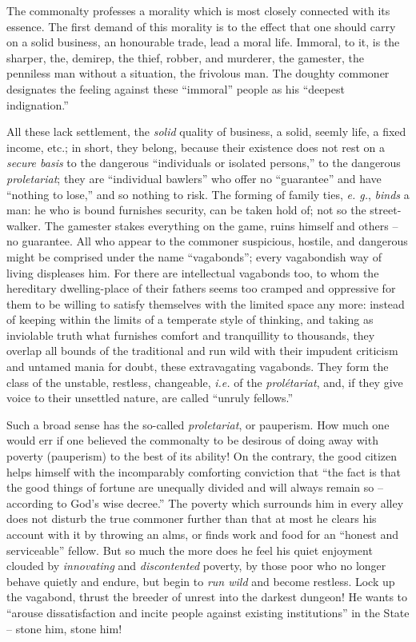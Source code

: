 \documentclass[12pt,a4paper]{book}
\begin{document}
The commonalty professes a morality which is most closely connected with its 
essence. The first demand of this morality is to the effect that one should 
carry on a solid business, an honourable trade, lead a moral life. Immoral, to 
it, is the sharper, the, demirep, the thief, robber, and murderer, the 
gamester, the penniless man without a situation, the frivolous man. The 
doughty commoner designates the feeling against these ``immoral'' people as 
his ``deepest indignation.''

All these lack settlement, the \textit{solid} quality of business, a solid, 
seemly life, a fixed income, etc.; in short, they belong, because their 
existence does not rest on a \textit{secure basis} to the dangerous 
``individuals or isolated persons,'' to the dangerous \textit{proletariat}; 
they are ``individual bawlers'' who offer no ``guarantee'' and have 
``nothing to lose,'' and so nothing to risk. The forming of family ties, 
\textit{e. g.}, \textit{binds} a man: he who is bound furnishes security, can 
be taken hold of; not so the street-walker. The gamester stakes everything on 
the game, ruins himself and others -- no guarantee. All who appear to the 
commoner suspicious, hostile, and dangerous might be comprised under the name 
``vagabonds''; every vagabondish way of living displeases him. For there are 
intellectual vagabonds too, to whom the hereditary dwelling-place of their 
fathers seems too cramped and oppressive for them to be willing to satisfy 
themselves with the limited space any more: instead of keeping within the 
limits of a temperate style of thinking, and taking as inviolable truth what 
furnishes comfort and tranquillity to thousands, they overlap all bounds of 
the traditional and run wild with their impudent criticism and untamed mania 
for doubt, these extravagating vagabonds. They form the class of the unstable, 
restless, changeable, \textit{i.e.} of the \textit{prol\'etariat}, and, if 
they give voice to their unsettled nature, are called ``unruly fellows.''

Such a broad sense has the so-called \textit{proletariat}, or pauperism. How 
much one would err if one believed the commonalty to be desirous of doing away 
with poverty (pauperism) to the best of its ability! On the contrary, the good 
citizen helps himself with the incomparably comforting conviction that ``the 
fact is that the good things of fortune are unequally divided and will always 
remain so -- according to God's wise decree.'' The poverty which surrounds 
him in every alley does not disturb the true commoner further than that at 
most he clears his account with it by throwing an alms, or finds work and food 
for an ``honest and serviceable'' fellow. But so much the more does he feel 
his quiet enjoyment clouded by \textit{innovating} and \textit{discontented} 
poverty, by those poor who no longer behave quietly and endure, but begin to 
\textit{run wild} and become restless. Lock up the vagabond, thrust the 
breeder of unrest into the darkest dungeon! He wants to ``arouse 
dissatisfaction and incite people against existing institutions'' in the 
State -- stone him, stone him!
\end{document}
